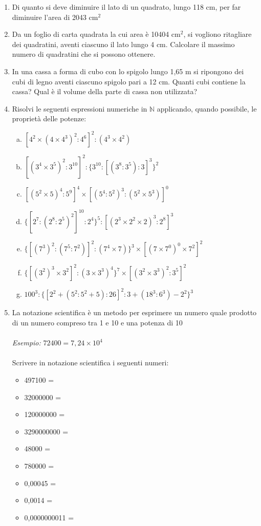 \documentclass[]{article}
\newcommand*\result[1] {\hspace*{0em plus 1fill}{\footnotesize \makebox{[#1]}}}
\begin{document}
\begin{enumerate}
	\item {Di quanto si deve diminuire il lato di un quadrato, lungo 118 cm, per far diminuire l'area di 2043 cm\(^2\)} \result{9 cm}
	
	\item {Da un foglio di carta quadrata la cui area è 10404 cm\(^2\), si vogliono ritagliare dei quadratini, aventi ciascuno il lato lungo 4 cm. Calcolare il massimo numero di quadratini che si possono ottenere.} \result{650}
	
	\item {In una cassa a forma di cubo con lo spigolo lungo 1,65 m si ripongono dei cubi di legno aventi ciascuno spigolo pari a 12 cm. Quanti cubi contiene la cassa? Qual è il volume della parte di cassa non utilizzata?} \result{2197; 696 cm\(^3\)}
	
	\item {Risolvi le seguenti espressioni numeriche in \(\mathbb{N}\) applicando, quando possibile, le proprietà delle potenze:
		\begin{enumerate}[a.]
			\item \([4^2\times(4\times4^3)^2:4^6]^2:(4^3\times4^2) \) \result{\(4^3\)}
			\item \([(3^4\times3^5)^2:3^{10}]^2:\{3^{10}:[(3^8:3^5):3]^3\}^2\) \result{\(3^8\)}
			\item \([(5^2\times5)^4:5^9]^4\times[(5^4:5^2)^3:(5^2\times5^3)]^0\) \result{\(5^{12}\)}
			\item \(\{[2^7:(2^8:2^5)^2]^{10}:2^4\}^5:[(2^3\times2^2\times2)^3:2^8]^3\) \result{1}
			\item \(\{[(7^3)^2:(7^5:7^2)]^2:(7^4\times7)\}^3\times[(7\times7^0)^0\times7^2]^2\) \result{\(7^7\)}
			\item \(\{[(3^2)^3\times3^2]^2:(3\times3^3)^4\}^7\times[(3^2\times3^3)^2:3^5]^2\) \result{\(3^{10}\)}
			\item \(100^3:\{[2^2+(5^2:5^2+5):26]^2:3+(18^3:6^3)-2^2\}^3\) \result{8}
		\end{enumerate}
	}

	\item {La notazione scientifica è un metodo per esprimere un numero quale prodotto di un numero compreso tra 1 e 10 e una potenza di 10 \\ \\ \textit{Esempio: } \(72400 = 7,24 \times 10^4\) \\ \\ Scrivere in notazione scientifica i seguenti numeri:
	\begin{itemize}
			\item 497100 =
			\item 32000000 =
			\item 120000000 =
			\item 3290000000 =
			\item 48000 =
			\item 780000 =
			\item 0,00045 =
			\item 0,0014 =
			\item 0,0000000011 = 
	\end{itemize}
	}


\end{enumerate}
\end{document}
